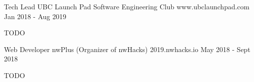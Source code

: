 \begin{cventries}

  \cventry
    {Tech Lead} %
    {UBC Launch Pad Software Engineering Club} %
    {www.ubclaunchpad.com} %
    {Jan 2018 - Aug 2019} %
    {
      \begin{cvitems} %
        \item {TODO}
      \end{cvitems}
    }

  \cventry
    {Web Developer} %
    {nwPlus (Organizer of nwHacks)} %
    {2019.nwhacks.io} %
    {May 2018 - Sept 2018} %
    {
      \begin{cvitems} %
        \item {TODO}
      \end{cvitems}
    }

\end{cventries}
